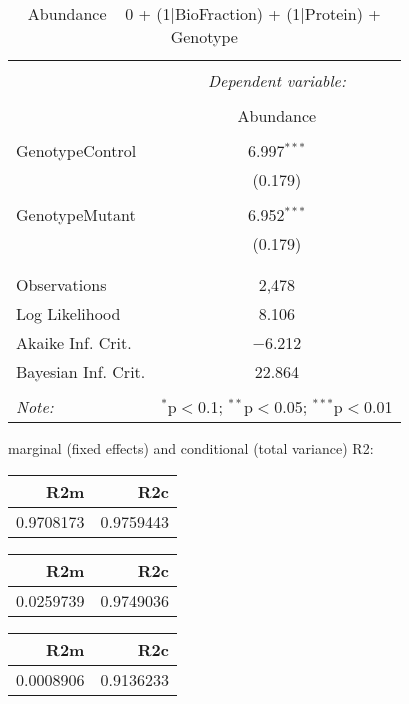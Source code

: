 \documentclass[11pt]{report}
\begin{document}
\begin{table}[!htbp] \centering 
  \caption{Abundance ~ 0 + (1|BioFraction) + (1|Protein) + Genotype} 
  \label{} 
\begin{tabular}{@{\extracolsep{5pt}}lc} 
\\[-1.8ex]\hline 
\hline \\[-1.8ex] 
 & \multicolumn{1}{c}{\textit{Dependent variable:}} \\ 
\cline{2-2} 
\\[-1.8ex] & Abundance \\ 
\hline \\[-1.8ex] 
 GenotypeControl & 6.997$^{***}$ \\ 
  & (0.179) \\ 
  & \\ 
 GenotypeMutant & 6.952$^{***}$ \\ 
  & (0.179) \\ 
  & \\ 
\hline \\[-1.8ex] 
Observations & 2,478 \\ 
Log Likelihood & 8.106 \\ 
Akaike Inf. Crit. & $-$6.212 \\ 
Bayesian Inf. Crit. & 22.864 \\ 
\hline 
\hline \\[-1.8ex] 
\textit{Note:}  & \multicolumn{1}{r}{$^{*}$p$<$0.1; $^{**}$p$<$0.05; $^{***}$p$<$0.01} \\ 
\end{tabular} 
\end{table} 
marginal (fixed effects) and conditional (total variance) R2:

\begin{tabular}{r|r}
\hline
R2m & R2c\\
\hline
0.9708173 & 0.9759443\\
\hline
\end{tabular}

\begin{tabular}{r|r}
\hline
R2m & R2c\\
\hline
0.0259739 & 0.9749036\\
\hline
\end{tabular}

\begin{tabular}{r|r}
\hline
R2m & R2c\\
\hline
0.0008906 & 0.9136233\\
\hline
\end{tabular}
\end{document}
